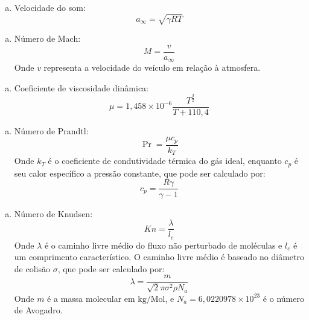 \begin{enumerate}[(a)] 
\item Velocidade do som: 
\begin{equation}
a_{\infty}=\sqrt{\gamma R T}
\end{equation}
\end{enumerate}


\begin{enumerate}[(b)] 
\item Número de Mach:
\begin{equation}
M=\frac{v}{a_{\infty}}
\end{equation}
Onde $v$ representa a velocidade do veículo em relação à atmosfera.
\end{enumerate}

\begin{enumerate}[(c)] 
\item Coeficiente de viscosidade dinâmica:
\begin{equation}
\mu=1,458 \times 10^{-6} \frac{T^{\frac{3}{2}}}{T+110,4}
\end{equation}
\end{enumerate}

\begin{enumerate}[(d)] 
\item Número de Prandtl:
\begin{equation}
\operatorname{Pr}=\frac{\mu c_{p}}{k_{T}}
\end{equation}
Onde $k_{T}$ é o coeficiente de condutividade térmica do gás ideal, enquanto $c_{p}$ é seu calor específico a pressão constante, que pode ser calculado por:
\begin{equation}
c_{p}=\frac{R \gamma}{\gamma-1}
\end{equation}
\end{enumerate}

\begin{enumerate}[(e)] 
\item Número de Knudsen:
\begin{equation}
K n=\frac{\lambda}{l_{c}}
\end{equation}
Onde $\lambda$ é o caminho livre médio do fluxo não perturbado de moléculas e $l_{c}$ é um comprimento característico. O caminho livre médio é baseado no diâmetro de colisão $\sigma$, que pode ser calculado por:
\begin{equation}
\lambda=\frac{m}{\sqrt{2} \pi \sigma^{2} \rho N_{a}}
\end{equation}
Onde $m$ é a massa molecular em $\mathrm{kg} / \mathrm{Mol}$, e $N_{a}=6,0220978 \times 10^{23}$ é o número de Avogadro.
\end{enumerate}

